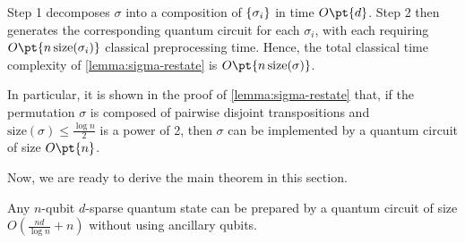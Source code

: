 \documentclass[a4paper,UKenglish,cleveref, autoref, thm-restate]{lipics-v2021}
\DeclarePairedDelimiter\cbra{\{}{\}}
\newcommand{\bo}{O\pt}
\begin{document}
Step 1 decomposes $\sigma$ into a composition of $\cbra{\sigma_i}$ in time $\bo{d}$. Step 2 then generates the corresponding quantum circuit for each $\sigma_i$, with each requiring $\bo{n\,\mathrm{size}(\sigma_i)}$ classical preprocessing time. Hence, the total classical time complexity of \cref{lemma:sigma-restate} is $\bo{n\,\mathrm{size}(\sigma)}$.

\begin{remark}\label{remark:sigma}
    In particular, it is shown in the proof of \cref{lemma:sigma-restate} that, if the permutation $\sigma$ is composed of pairwise disjoint transpositions and $\mathrm{size}(\sigma) \leq \frac{\log n}{2}$ is a power of 2, then $\sigma$ can be implemented by a quantum circuit of size $\bo{n}$.
\end{remark}

Now, we are ready to derive the main theorem in this section. 
\begin{theorem}
Any $n$-qubit $d$-sparse quantum state can be prepared by a quantum circuit of size $O(\frac{nd}{\log n} + n)$ without using ancillary qubits.
\end{theorem}
\end{document}
